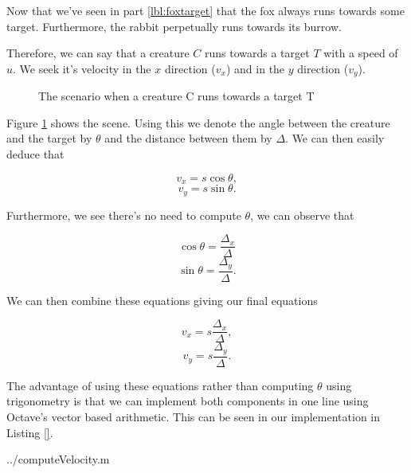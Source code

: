 Now that we've seen in part \ref{lbl:foxtarget} that the fox always runs towards some target. Furthermore, the rabbit perpetually runs towards its burrow. 

Therefore, we can say that a creature $C$ runs towards a target $T$ with a speed of $u$. We seek it's velocity in the $x$ direction ($v_x$) and in the $y$ direction ($v_y$).

\begin{figure}[h]
\label{fig:chasing}
\caption{The scenario when a creature C runs towards a target T}
\centering
{}
\end{figure}

Figure \ref{fig:chasing} shows the scene. Using this we denote the angle between the creature and the target by $\theta$ and the distance between them by $\Delta$. We can then easily deduce that

$$ v_x = s\cos{\theta}, $$
$$ v_y = s\sin{\theta}. $$

Furthermore, we see there's no need to compute $\theta$, we can observe that 

$$ \cos{\theta} = \frac{\Delta_x}{\Delta}$$
$$ \sin{\theta} = \frac{\Delta_y}{\Delta}.$$

We can then combine these equations giving our final equations

$$ v_x = s \frac{\Delta_x}{\Delta},$$
$$ v_y = s \frac{\Delta_y}{\Delta}.$$

The advantage of using these equations rather than computing $\theta$ using trigonometry is that we can implement both components in one line using Octave's vector based arithmetic. This can be seen in our implementation in Listing \ref{}.

  {../computeVelocity.m}
